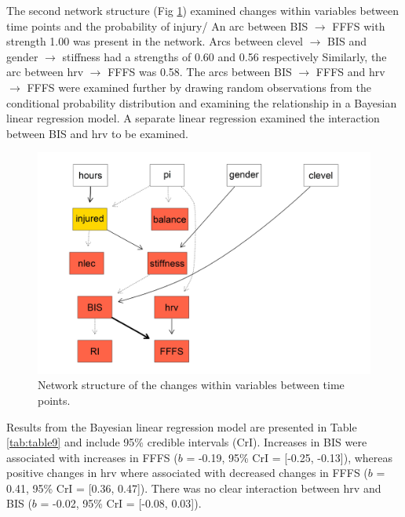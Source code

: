\documentclass[
  english,
  man,floatsintext]{apa6}
\begin{document}
The second network structure (Fig \ref{fig:fig9}) examined changes within variables between time points and the probability of injury/
An arc between BIS \(\rightarrow\) FFFS with strength 1.00 was present in the network.
Arcs between clevel \(\rightarrow\) BIS and gender \(\rightarrow\) stiffness had a strengths of 0.60 and 0.56 respectively
Similarly, the arc between hrv \(\rightarrow\) FFFS was 0.58.
The arcs between BIS \(\rightarrow\) FFFS and hrv \(\rightarrow\) FFFS were examined further by drawing random observations from the conditional probability distribution and examining the relationship in a Bayesian linear regression model.
A separate linear regression examined the interaction between BIS and hrv to be examined.

\begin{figure}

{\centering \includegraphics[width=1\linewidth]{figures_doc/Fig9} 

}

\caption{Network structure of the changes within variables between time points.}\label{fig:fig9}
\end{figure}

Results from the Bayesian linear regression model are presented in Table \ref{tab:table9} and include 95\% credible intervals (CrI).
Increases in BIS were associated with increases in FFFS (\(b\) = -0.19, 95\% CrI = {[}-0.25, -0.13{]}), whereas positive changes in hrv where associated with decreased changes in FFFS (\(b\) = 0.41, 95\% CrI = {[}0.36, 0.47{]}).
There was no clear interaction between hrv and BIS (\(b\) = -0.02, 95\% CrI = {[}-0.08, 0.03{]}).
\end{document}
